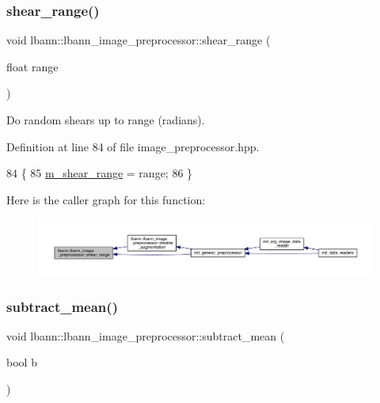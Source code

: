 \subsubsection{\texorpdfstring{shear\+\_\+range()}{shear\_range()}}
{\footnotesize\ttfamily void lbann\+::lbann\+\_\+image\+\_\+preprocessor\+::shear\+\_\+range (\begin{DoxyParamCaption}\item[{float}]{range }\end{DoxyParamCaption})\hspace{0.3cm}{\ttfamily [inline]}}

Do random shears up to range (radians). 

Definition at line 84 of file image\+\_\+preprocessor.\+hpp.


\begin{DoxyCode}
84                                 \{
85     \hyperlink{classlbann_1_1lbann__image__preprocessor_a237ead6488b2c04e982fd10510ae03b4}{m\_shear\_range} = range;
86   \}
\end{DoxyCode}
Here is the caller graph for this function\+:\nopagebreak
\begin{figure}[H]
\begin{center}
\leavevmode
\includegraphics[width=350pt]{classlbann_1_1lbann__image__preprocessor_aef1e2375fd518e69df800b0dcbcb37d0_icgraph}
\end{center}
\end{figure}
\mbox{\label{classlbann_1_1lbann__image__preprocessor_afa470b696ba435c20050187a0232717d}} 
\subsubsection{\texorpdfstring{subtract\+\_\+mean()}{subtract\_mean()}}
{\footnotesize\ttfamily void lbann\+::lbann\+\_\+image\+\_\+preprocessor\+::subtract\+\_\+mean (\begin{DoxyParamCaption}\item[{bool}]{b }\end{DoxyParamCaption})\hspace{0.3cm}{\ttfamily [inline]}}


